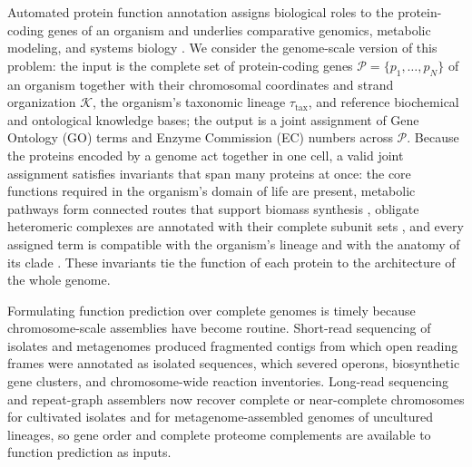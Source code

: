 \documentclass[10pt,twocolumn]{article}
\begin{document}
Automated protein function annotation assigns biological roles to the protein-coding genes of an organism and underlies comparative genomics, metabolic modeling, and systems biology \citep{radivojac2013large,zhou2019cafa}. We consider the genome-scale version of this problem: the input is the complete set of protein-coding genes $\mathcal{P}=\{p_1,\dots,p_N\}$ of an organism together with their chromosomal coordinates and strand organization $\mathcal{K}$, the organism's taxonomic lineage $\tau_{\text{tax}}$, and reference biochemical and ontological knowledge bases; the output is a joint assignment of Gene Ontology (GO) terms \citep{ashburner2000gene,go2023knowledgebase} and Enzyme Commission (EC) numbers across $\mathcal{P}$. Because the proteins encoded by a genome act together in one cell, a valid joint assignment satisfies invariants that span many proteins at once: the core functions required in the organism's domain of life are present, metabolic pathways form connected routes that support biomass synthesis \citep{osterman2003missing,karp2018how}, obligate heteromeric complexes are annotated with their complete subunit sets \citep{giurgiu2019corum,meldal2022complexportal}, and every assigned term is compatible with the organism's lineage and with the anatomy of its clade \citep{deegan2010formalization,mungall2012uberon}. These invariants tie the function of each protein to the architecture of the whole genome.

Formulating function prediction over complete genomes is timely because chromosome-scale assemblies have become routine. Short-read sequencing of isolates and metagenomes produced fragmented contigs from which open reading frames were annotated as isolated sequences, which severed operons, biosynthetic gene clusters, and chromosome-wide reaction inventories. Long-read sequencing \citep{amarasinghe2020longread,logsdon2020longread} and repeat-graph assemblers \citep{kolmogorov2020metaflye} now recover complete or near-complete chromosomes for cultivated isolates and for metagenome-assembled genomes of uncultured lineages, so gene order and complete proteome complements are available to function prediction as inputs.
\end{document}
